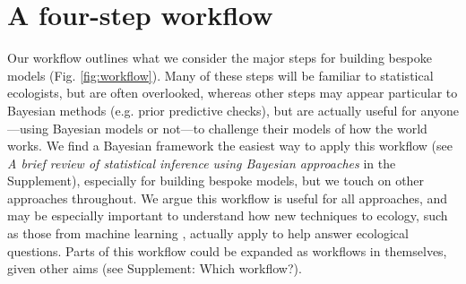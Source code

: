 \documentclass[11pt]{article}
\begin{document}

\section*{A four-step workflow}

Our workflow outlines what we consider the major steps for building bespoke models (Fig. \ref{fig:workflow}). Many of these steps will be familiar to statistical ecologists, but are often overlooked, whereas other steps may appear particular to Bayesian methods (e.g. prior predictive checks), but are actually useful for anyone---using Bayesian models or not---to challenge their models of how the world works. We find a Bayesian framework the easiest way to apply this workflow (see \emph{A brief review of statistical inference using Bayesian approaches} in the Supplement), especially for building bespoke models, but we touch on other approaches throughout. We argue this workflow is useful for all approaches, and may be especially important to understand how new techniques to ecology, such as those from machine learning \citep{pichler2023machine}, actually apply to help answer ecological questions. Parts of this workflow could be expanded as workflows in themselves, given other aims (see Supplement: Which workflow?). %
\end{document}
